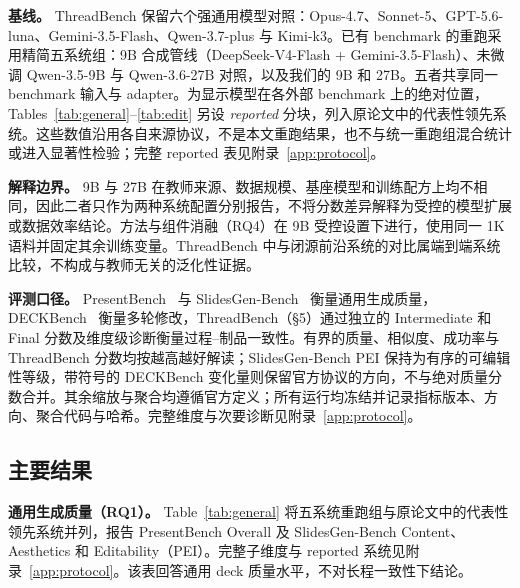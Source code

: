 \textbf{基线。} ThreadBench 保留六个强通用模型对照：Opus-4.7、Sonnet-5、GPT-5.6-luna、Gemini-3.5-Flash、Qwen-3.7-plus 与 Kimi-k3。已有 benchmark 的重跑采用精简五系统组：9B 合成管线（DeepSeek-V4-Flash + Gemini-3.5-Flash）、未微调 Qwen-3.5-9B 与 Qwen-3.6-27B 对照，以及我们的 9B 和 27B。五者共享同一 benchmark 输入与 adapter。为显示模型在各外部 benchmark 上的绝对位置，Tables~\ref{tab:general}--\ref{tab:edit} 另设 \emph{reported} 分块，列入原论文中的代表性领先系统。这些数值沿用各自来源协议，不是本文重跑结果，也不与统一重跑组混合统计或进入显著性检验；完整 reported 表见附录~\ref{app:protocol}。

\textbf{解释边界。} 9B 与 27B 在教师来源、数据规模、基座模型和训练配方上均不相同，因此二者只作为两种系统配置分别报告，不将分数差异解释为受控的模型扩展或数据效率结论。方法与组件消融（RQ4）在 9B 受控设置下进行，使用同一 1K 语料并固定其余训练变量。ThreadBench 中与闭源前沿系统的对比属端到端系统比较，不构成与教师无关的泛化性证据。

\textbf{评测口径。} PresentBench~\citep{chen2026presentbench} 与 SlidesGen-Bench~\citep{yang2026slidesgenbench} 衡量通用生成质量，DECKBench~\citep{jang2026deckbench} 衡量多轮修改，ThreadBench（§5）通过独立的 Intermediate 和 Final 分数及维度级诊断衡量过程–制品一致性。有界的质量、相似度、成功率与 ThreadBench 分数均按越高越好解读；SlidesGen-Bench PEI 保持为有序的可编辑性等级，带符号的 DECKBench 变化量则保留官方协议的方向，不与绝对质量分数合并。其余缩放与聚合均遵循官方定义；所有运行均冻结并记录指标版本、方向、聚合代码与哈希。完整维度与次要诊断见附录~\ref{app:protocol}。

\subsection{主要结果}

\textbf{通用生成质量（RQ1）。} Table~\ref{tab:general} 将五系统重跑组与原论文中的代表性领先系统并列，报告 PresentBench Overall 及 SlidesGen-Bench Content、Aesthetics 和 Editability（PEI）。完整子维度与 reported 系统见附录~\ref{app:protocol}。该表回答通用 deck 质量水平，不对长程一致性下结论。

